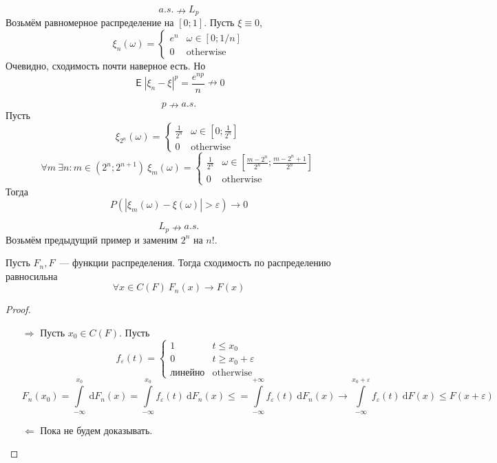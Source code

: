\documentclass{article}
\DeclareMathOperator{\Expected}{\mathsf{E}}
\begin{document}
    \begin{example}
        $$a.s.\nrightarrow L_p$$
        Возьмём равномерное распределение на $[0;1]$. Пусть $\xi\equiv0$,
        $$\xi_n(\omega)=\begin{cases}
            e^n & \omega\in[0;1/n]\\0 & \mathrm{otherwise}
        \end{cases}$$
        Очевидно, сходимость почти наверное есть. Но
        $$
        \Expected|\xi_n-\xi|^p=\frac{e^{np}}n\nrightarrow0
        $$
    \end{example}
    \begin{example}
        $$
        p\nrightarrow a.s.
        $$
        Пусть
        $$\xi_{2^n}(\omega)=\begin{cases}
            \frac1{2^n} & \omega\in[0;\frac1{2^n}]\\0&\mathrm{otherwise}
        \end{cases}$$
        $$
        \forall m~\exists n:m\in(2^n;2^{n+1})~\xi_m(\omega)=\begin{cases}
            \frac1{2^n} & \omega\in[\frac{m-2^n}{2^n};\frac{m-2^n+1}{2^n}]\\0&\mathrm{otherwise}
        \end{cases}
        $$
        Тогда
        $$
        P(|\xi_m(\omega)-\xi(\omega)|>\varepsilon)\rightarrow0
        $$
    \end{example}
    \begin{example}
        $$
        L_p\nrightarrow a.s.
        $$
        Возьмём предыдущий пример и заменим $2^n$ на $n!$.
    \end{example}
    \begin{theorem}
        Пусть $F_n,F$~--- функции распределения. Тогда сходимость по распределению равносильна $$
        \forall x\in C(F)~F_n(x)\to F(x)
        $$
    \end{theorem}
    \begin{proof}
        \begin{itemize}
            \item[$\Rightarrow$]
            Пусть $x_0\in C(F)$. Пусть
            $$
            f_\varepsilon(t)=\begin{cases}
                1 & t\leqslant x_0\\
                0 & t\geqslant x_0+\varepsilon\\
                \text{линейно} & \mathrm{otherwise}
            \end{cases}
            $$
            $$F_n(x_0)=\int\limits_{-\infty}^{x_0}~\mathrm dF_n(x)=\int\limits_{-\infty}^{x_0}f_\varepsilon(t)~\mathrm dF_n(x)\leqslant =\int\limits_{-\infty}^{+\infty}f_\varepsilon(t)~\mathrm dF_n(x)\rightarrow \int\limits_{-\infty}^{x_0+\varepsilon}f_\varepsilon(t)~\mathrm dF(x)\leqslant F(x+\varepsilon)$$
            \item[$\Leftarrow$]
            Пока не будем доказывать.
        \end{itemize}
    \end{proof}
\end{document}
